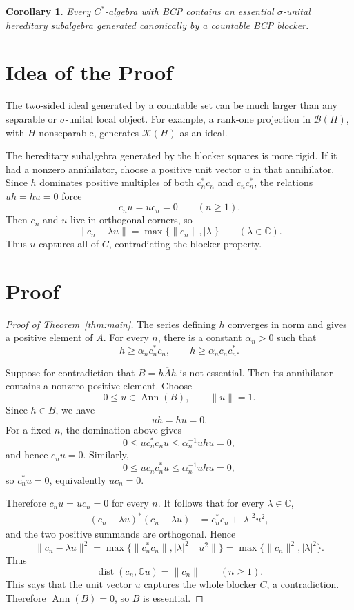 \documentclass[11pt]{article}
\newtheorem{corollary}{Corollary}
\newcommand{\C}{\mathbb C}
\newcommand{\dist}{\operatorname{dist}}
\begin{document}
\begin{corollary}
\label{cor:sigma}
Every \(C^*\)-algebra with BCP contains an essential \(\sigma\)-unital
hereditary subalgebra generated canonically by a countable BCP blocker.
\end{corollary}

\section*{Idea of the Proof}

The two-sided ideal generated by a countable set can be much larger than any
separable or \(\sigma\)-unital local object.  For example, a rank-one
projection in \(\mathcal B(H)\), with \(H\) nonseparable, generates
\(\mathcal K(H)\) as an ideal.

The hereditary subalgebra generated by the blocker squares is more rigid.
If it had a nonzero annihilator, choose a positive unit vector \(u\) in that
annihilator.  Since \(h\) dominates positive multiples of both
\(c_n^*c_n\) and \(c_nc_n^*\), the relations \(uh=hu=0\) force
\[
        c_nu=uc_n=0 \qquad(n\ge1).
\]
Then \(c_n\) and \(u\) live in orthogonal corners, so
\[
        \|c_n-\lambda u\|=\max\{\|c_n\|,|\lambda|\}
        \qquad(\lambda\in\C).
\]
Thus \(u\) captures all of \(C\), contradicting the blocker property.

\section*{Proof}

\begin{proof}[Proof of Theorem~\ref{thm:main}]
The series defining \(h\) converges in norm and gives a positive element of
\(A\).  For every \(n\), there is a constant \(\alpha_n>0\) such that
\[
        h\ge \alpha_n c_n^*c_n,
        \qquad
        h\ge \alpha_n c_nc_n^* .
\]

Suppose for contradiction that \(B=\overline{hAh}\) is not essential.  Then
its annihilator contains a nonzero positive element.  Choose
\[
        0\le u\in \operatorname{Ann}(B),
        \qquad
        \|u\|=1.
\]
Since \(h\in B\), we have
\[
        uh=hu=0.
\]
For a fixed \(n\), the domination above gives
\[
        0\le u c_n^*c_n u\le \alpha_n^{-1} uhu=0,
\]
and hence \(c_nu=0\).  Similarly,
\[
        0\le u c_nc_n^* u\le \alpha_n^{-1} uhu=0,
\]
so \(c_n^*u=0\), equivalently \(uc_n=0\).

Therefore \(c_nu=uc_n=0\) for every \(n\).  It follows that for every
\(\lambda\in\C\),
\[
\begin{aligned}
        (c_n-\lambda u)^*(c_n-\lambda u)
        &=
        c_n^*c_n+|\lambda|^2u^2,
\end{aligned}
\]
and the two positive summands are orthogonal.  Hence
\[
        \|c_n-\lambda u\|^2
        =
        \max\{\|c_n^*c_n\|,|\lambda|^2\|u^2\|\}
        =
        \max\{\|c_n\|^2,|\lambda|^2\}.
\]
Thus
\[
        \dist(c_n,\C u)=\|c_n\|
        \qquad(n\ge1).
\]
This says that the unit vector \(u\) captures the whole blocker \(C\), a
contradiction.  Therefore \(\operatorname{Ann}(B)=0\), so \(B\) is essential.
\end{proof}
\end{document}
